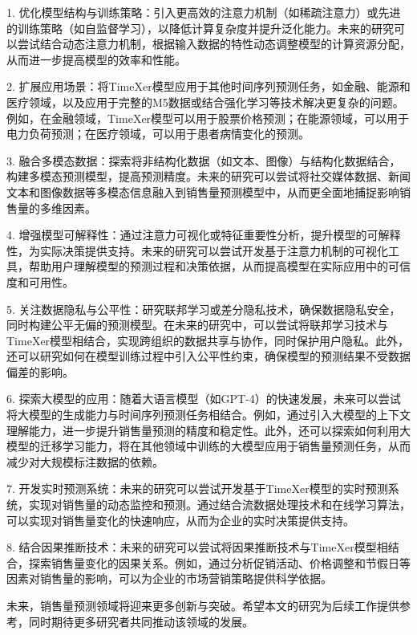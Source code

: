 \documentclass[12pt]{article}
\begin{document}
1. 优化模型结构与训练策略：引入更高效的注意力机制（如稀疏注意力）或先进的训练策略（如自监督学习），以降低计算复杂度并提升泛化能力\cite{MethodExpanding}。未来的研究可以尝试结合动态注意力机制，根据输入数据的特性动态调整模型的计算资源分配，从而进一步提高模型的效率和性能。

2. 扩展应用场景：将TimeXer模型应用于其他时间序列预测任务，如金融、能源和医疗领域，以及应用于完整的M5数据或结合强化学习等技术解决更复杂的问题。例如，在金融领域，TimeXer模型可以用于股票价格预测；在能源领域，可以用于电力负荷预测；在医疗领域，可以用于患者病情变化的预测。

3. 融合多模态数据：探索将非结构化数据（如文本、图像）与结构化数据结合，构建多模态预测模型，提高预测精度。未来的研究可以尝试将社交媒体数据、新闻文本和图像数据等多模态信息融入到销售量预测模型中，从而更全面地捕捉影响销售量的多维因素。

4. 增强模型可解释性：通过注意力可视化或特征重要性分析，提升模型的可解释性，为实际决策提供支持。未来的研究可以尝试开发基于注意力机制的可视化工具，帮助用户理解模型的预测过程和决策依据，从而提高模型在实际应用中的可信度和可用性。

5. 关注数据隐私与公平性：研究联邦学习或差分隐私技术，确保数据隐私安全，同时构建公平无偏的预测模型。在未来的研究中，可以尝试将联邦学习技术与TimeXer模型相结合，实现跨组织的数据共享与协作，同时保护用户隐私。此外，还可以研究如何在模型训练过程中引入公平性约束，确保模型的预测结果不受数据偏差的影响。

6. 探索大模型的应用：随着大语言模型（如GPT-4）的快速发展，未来可以尝试将大模型的生成能力与时间序列预测任务相结合。例如，通过引入大模型的上下文理解能力，进一步提升销售量预测的精度和稳定性。此外，还可以探索如何利用大模型的迁移学习能力，将在其他领域中训练的大模型应用于销售量预测任务，从而减少对大规模标注数据的依赖。

7. 开发实时预测系统：未来的研究可以尝试开发基于TimeXer模型的实时预测系统，实现对销售量的动态监控和预测。通过结合流数据处理技术和在线学习算法，可以实现对销售量变化的快速响应，从而为企业的实时决策提供支持。

8. 结合因果推断技术：未来的研究可以尝试将因果推断技术与TimeXer模型相结合，探索销售量变化的因果关系。例如，通过分析促销活动、价格调整和节假日等因素对销售量的影响，可以为企业的市场营销策略提供科学依据。

未来，销售量预测领域将迎来更多创新与突破。希望本文的研究为后续工作提供参考，同时期待更多研究者共同推动该领域的发展。







\appendix
\end{document}
